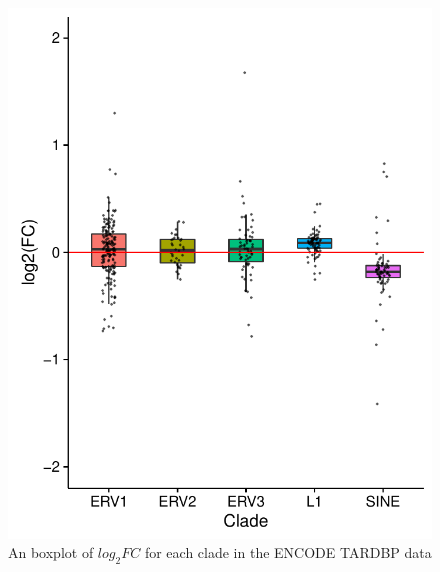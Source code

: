 \documentclass{ws-procs11x85}
\begin{document}
\begin{figure}[h]
\centerline{
\includegraphics[width=13cm]{boxplot-clade-k562}
}
\caption{An boxplot of $log_{2}FC$ for each clade in the ENCODE TARDBP data}
\label{aba:fig5}
\end{figure}




\end{document}
